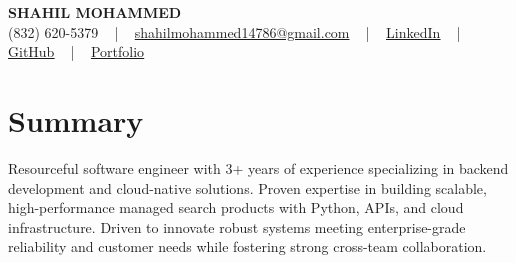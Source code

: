 \documentclass[letterpaper,10pt]{article}
\begin{document}
\begin{center}
    {\fontsize{14pt}{12pt}\selectfont \textbf{\MakeUppercase{Shahil Mohammed}}}\\ \vspace{2pt}
    \fontsize{10pt}{12pt}\selectfont (832) 620-5379 ~ | ~ \href{mailto:shahilmohammed14786@gmail.com}{shahilmohammed14786@gmail.com} ~ | ~  
    \href{https://www.linkedin.com/in/shahil-mohammed-9652931a1/}{\color{blue}\underline{LinkedIn}}  ~ | ~ 
    \href{https://github.com/freakbeast14}{\color{blue}\underline{GitHub}} ~ | ~ 
    \href{https://shahil-mohammed.netlify.app/}{\color{blue}\underline{Portfolio}}
    \vspace{-8pt}
\end{center}

\section{Summary}
\vspace{-2pt}\fontsize{8pt}{9pt}\selectfont
Resourceful software engineer with 3+ years of experience specializing in backend development and cloud-native solutions. Proven expertise in building scalable, high-performance managed search products with Python, APIs, and cloud infrastructure. Driven to innovate robust systems meeting enterprise-grade reliability and customer needs while fostering strong cross-team collaboration.
 \vspace{-5pt}
 
\vspace{-2pt}
\end{document}
